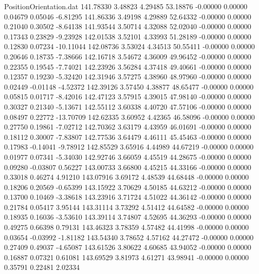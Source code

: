 \begin{filecontents}{PositionOrientation.dat}
 141.78330    3.48823    4.29485    53.18876   -0.00000    0.00000    0.04679    0.05046   -6.81295
 141.86336    3.49198    4.29889    52.64332   -0.00000    0.00000    0.21040    0.30502   -8.64138
 141.93544    3.50714    4.32088    52.02040   -0.00000    0.00000    0.17343    0.23829   -9.23928
 142.01538    3.52101    4.33993    51.28189   -0.00000    0.00000    0.12830    0.07234  -10.11044
 142.08736    3.53024    4.34513    50.55411   -0.00000    0.00000    0.20646    0.18735   -7.38666
 142.16718    3.54672    4.36009    49.96452   -0.00000    0.00000    0.22355    0.19545   -7.74021
 142.23926    3.56284    4.37418    49.40661   -0.00000    0.00000    0.12357    0.19230   -5.32420
 142.31946    3.57275    4.38960    48.97960   -0.00000    0.00000    0.02449   -0.01148   -4.52372
 142.39126    3.57450    4.38877    48.65477   -0.00000    0.00000    0.05815    0.01717   -8.42016
 142.47123    3.57915    4.39015    47.98140   -0.00000    0.00000    0.30327    0.21340   -5.13671
 142.55112    3.60338    4.40720    47.57106   -0.00000    0.00000    0.08497    0.22772  -13.70709
 142.62335    3.60952    4.42365    46.58096   -0.00000    0.00000    0.27750    0.19861   -7.02712
 142.70362    3.63179    4.43959    46.01691   -0.00000    0.00000    0.18112    0.30007   -7.83807
 142.77536    3.64479    4.46111    45.45463   -0.00000    0.00000    0.17983   -0.14041   -9.78912
 142.85529    3.65916    4.44989    44.67219   -0.00000    0.00000    0.01977    0.07341   -5.34030
 142.92746    3.66059    4.45519    44.28675   -0.00000    0.00000    0.09280   -0.03807    0.56227
 143.00733    3.66800    4.45215    44.33166   -0.00000    0.00000    0.33018    0.46274    4.91210
 143.07916    3.69172    4.48539    44.68448   -0.00000    0.00000    0.18206    0.20569   -0.65399
 143.15922    3.70629    4.50185    44.63212   -0.00000    0.00000    0.13700    0.10469   -3.38618
 143.23916    3.71724    4.51022    44.36142   -0.00000    0.00000    0.21784    0.05417    3.95144
 143.31114    3.73292    4.51412    44.64582   -0.00000    0.00000    0.18935    0.16036   -3.53610
 143.39114    3.74807    4.52695    44.36293   -0.00000    0.00000    0.49275    0.66398    0.79131
 143.46323    3.78359    4.57482    44.41998   -0.00000    0.00000    0.03654   -0.03992   -1.81182
 143.54340    3.78652    4.57162    44.27472   -0.00000    0.00000    0.27409    0.49037   -4.65087
 143.61526    3.80622    4.60685    43.94052   -0.00000    0.00000    0.16887    0.07321    0.61081
 143.69529    3.81973    4.61271    43.98941   -0.00000    0.00000    0.35791    0.22481    2.02334

\end{filecontents}
